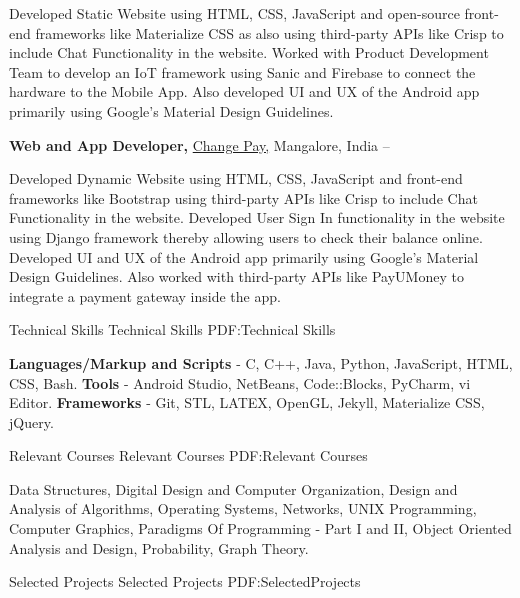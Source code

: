 \documentclass[letterpaper,MMMyyyy,nonstopmode]{simpleresumecv}
\begin{document}
\begin{Body}
\Gap
\BulletItem
Developed Static Website using HTML, CSS, JavaScript and open-source front-end frameworks like Materialize CSS as also using third-party APIs like Crisp to include Chat Functionality in the website.
\BulletItem
Worked with Product Development Team to develop an IoT framework using Sanic and Firebase to connect the hardware to the Mobile App.
\BulletItem
Also developed UI and UX of the Android app primarily using Google's Material Design Guidelines.
\Gap

\Entry
\textbf{Web and App Developer,}
\href{http://changepay.in/}
{Change Pay,}
Mangalore, India
\hfill
{} --

\Gap
\BulletItem
Developed Dynamic Website using HTML, CSS, JavaScript and front-end frameworks like Bootstrap using third-party APIs like Crisp to include Chat Functionality in the website.
\BulletItem
Developed User Sign In functionality in the website using Django framework thereby allowing users to check their balance online.
\BulletItem
Developed UI and UX of the Android app primarily using Google's Material Design Guidelines.
\BulletItem
Also worked with third-party APIs like PayUMoney to integrate a payment gateway inside the app.


\Section
{Technical Skills}
{Technical Skills}
{PDF:Technical Skills}

\Entry
\textbf{Languages/Markup and Scripts}
- C, C++, Java, Python, JavaScript, HTML, CSS, Bash.
\Gap
\textbf{Tools}
- Android Studio, NetBeans, Code::Blocks, PyCharm, vi Editor.
\Gap
\textbf{Frameworks}
- Git, STL, LATEX, OpenGL, Jekyll, Materialize CSS, jQuery.

\BigGap



\Section
{Relevant Courses}
{Relevant Courses}
{PDF:Relevant Courses}

\Entry
Data Structures,
Digital Design and Computer Organization, Design and Analysis of Algorithms, Operating Systems, Networks, UNIX
Programming, Computer Graphics, Paradigms Of Programming - Part I and II, Object Oriented Analysis and Design, Probability, Graph Theory.



\Section
{Selected Projects}
{Selected Projects}
{PDF:SelectedProjects}


\end{Body}
\end{document}
